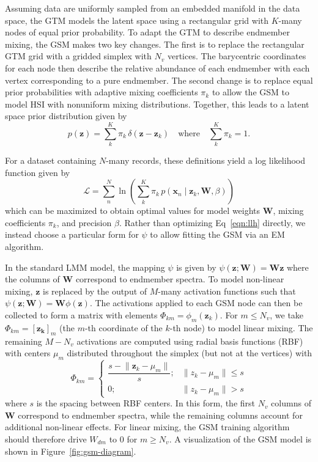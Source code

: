 Assuming data are uniformly sampled from an embedded manifold in the data space,
the GTM models the latent space using a rectangular grid with $K$-many nodes of
equal prior probability. To adapt the GTM to describe endmember mixing, the GSM
makes two key changes. The first is to replace the rectangular GTM grid with a
gridded simplex with $N_v$ vertices. The barycentric coordinates for each node
then describe the relative abundance of each endmember with each vertex
corresponding to a pure endmember. The second change is to replace equal prior
probabilities with adaptive mixing coefficients $\pi_k$ to allow the GSM to
model HSI with nonuniform mixing distributions. Together, this leads to a latent
space prior distribution given by
\begin{equation}\label{eqn:latent-distribution}
    p(\mathbf{z}) = \sum\limits_k^K \pi_k \, \delta(\mathbf{z} - \mathbf{z}_k) \quad\text{where}\quad  \sum_k^K\pi_k = 1.
\end{equation}

For a dataset containing $N$-many records, these definitions yield a log
likelihood function given by
\begin{equation}\label{eqn:llh}
    \mathscr{L} = \sum\limits_n^N \ln \left( \sum\limits_k^K \pi_k \, p(\mathbf{x}_n \mid \mathbf{z}_k, \mathbf{W}, \beta) \right)
\end{equation}
which can be maximized to obtain optimal values for model weights $\mathbf{W}$,
mixing coefficients $\pi_k$, and precision $\beta$. Rather than optimizing
Eq~\ref{eqn:llh} directly, we instead choose a particular form for $\psi$ to
allow fitting the GSM via an EM algorithm.

In the standard LMM model, the mapping $\psi$ is given by
$\psi(\mathbf{z};\mathbf{W}) = \mathbf{W}\mathbf{z}$ where the columns
of $\mathbf{W}$ correspond to endmember spectra. To model non-linear mixing, $\mathbf{z}$
is replaced by the output of $M$-many activation functions such that $\psi(\mathbf{z};\mathbf{W})
= \mathbf{W}\phi(\mathbf{z})$. The activations applied to each GSM node can then be
collected to form a matrix with elements $\Phi_{km} = \phi_m(\mathbf{z}_k)$. For $m \leq
N_v$, we take $\Phi_{km} = [\mathbf{z_{k}}]_m$ (the $m$-th coordinate of the $k$-th node) to
model linear mixing. The remaining  $M-N_v$ activations are computed using
radial basis functions (RBF) with centers $\mu_m$
distributed throughout the simplex (but not at the vertices) with
\begin{equation}\label{eq:act-function}
    \Phi_{km} = \begin{cases}
        \dfrac{s - \lVert \mathbf{z}_k - \mu_m \rVert}{s}; & \lVert z_k - \mu_m \rVert \leq s \\
        0; & \lVert z_k - \mu_m \rVert > s
    \end{cases}
\end{equation}
where $s$ is the spacing between RBF centers. In this form, the first $N_v$
columns of $\mathbf{W}$ correspond to endmember spectra, while the remaining
columns account for additional non-linear effects. For linear mixing, the GSM
training algorithm should therefore drive $W_{dm}$ to $0$ for $m\geq N_v$. A
visualization of the GSM model is shown in Figure~\ref{fig:gsm-diagram}.


